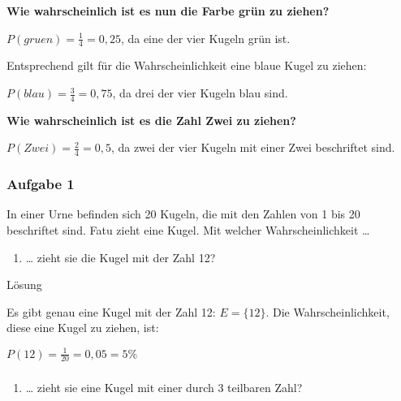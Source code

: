 \documentclass[
  ngerman,
]{book}
\providecommand{\tightlist}{%
  \setlength{\itemsep}{0pt}\setlength{\parskip}{0pt}}
\begin{document}
\textbf{Wie wahrscheinlich ist es nun die Farbe grün zu ziehen?}

\(P(gruen)=\frac{1}{4}=0,25\), da eine der vier Kugeln grün ist.

Entsprechend gilt für die Wahrscheinlichkeit eine blaue Kugel zu ziehen:

\(P(blau)=\frac{3}{4}=0,75\), da drei der vier Kugeln blau sind.

\textbf{Wie wahrscheinlich ist es die Zahl Zwei zu ziehen?}

\(P(Zwei)=\frac{2}{4}=0,5\), da zwei der vier Kugeln mit einer Zwei beschriftet sind.

\hypertarget{section-87}{%
\subsubsection*{}\label{section-87}}

\hypertarget{aufgabe-1-10}{%
\subsubsection*{Aufgabe 1}\label{aufgabe-1-10}}

In einer Urne befinden sich 20 Kugeln, die mit den Zahlen von 1 bis 20 beschriftet sind. Fatu zieht eine Kugel. Mit welcher Wahrscheinlichkeit \ldots{}

\begin{enumerate}
\def\labelenumi{\alph{enumi})}
\tightlist
\item
  \ldots{} zieht sie die Kugel mit der Zahl 12?
\end{enumerate}

Lösung

Es gibt genau eine Kugel mit der Zahl 12: \(E=\{12\}\). Die Wahrscheinlichkeit, diese eine Kugel zu ziehen, ist:

\(P(12)=\frac{1}{20}= 0,05 = 5\%\)

\hypertarget{section-88}{%
\subsubsection*{}\label{section-88}}

\begin{enumerate}
\def\labelenumi{\alph{enumi})}
\setcounter{enumi}{1}
\tightlist
\item
  \ldots{} zieht sie eine Kugel mit einer durch 3 teilbaren Zahl?
\end{enumerate}
\end{document}

